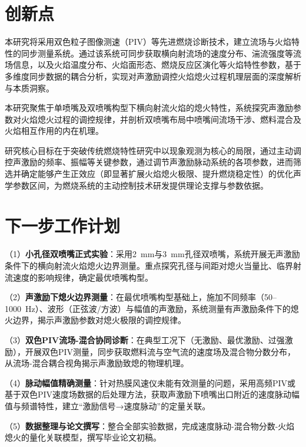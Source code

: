 \section{创新点}

本研究将采用双色粒子图像测速（PIV）等先进燃烧诊断技术，建立流场与火焰特性的同步测量系统。通过该系统可同步获取横向射流场的速度分布、湍流强度等流场信息，以及火焰温度分布、火焰面形态、燃烧反应区演化等火焰特性参数，基于多维度同步数据的耦合分析，实现对声激励调控火焰熄火过程机理层面的深度解析与本质洞察。

本研究聚焦于单喷嘴及双喷嘴构型下横向射流火焰的熄火特性，系统探究声激励参数对火焰熄火过程的调控规律，并剖析双喷嘴布局中喷嘴间流场干涉、燃料混合及火焰相互作用的内在机理。

研究核心目标在于突破传统燃烧特性研究中以现象观测为核心的局限，通过主动调控声激励的频率、振幅等关键参数，通过调节声激励脉动系统的各项参数，进而筛选并确定能够产生正效应（即显著扩展火焰熄火极限、提升燃烧稳定性）的优化声学参数区间，为燃烧系统的主动控制技术研发提供理论支撑与参数依据。


\section{下一步工作计划}

（1）\textbf{小孔径双喷嘴正式实验}：采用2~mm与3~mm孔径双喷嘴，系统开展无声激励条件下的横向射流火焰熄火边界测量。重点探究孔径与间距对熄火当量比、临界射流速度的影响规律，确定最优喷嘴构型。

（2）\textbf{声激励下熄火边界测量}：在最优喷嘴构型基础上，施加不同频率（50--1000~Hz）、波形（正弦波/方波）与幅值的声激励，系统测量有声激励条件下的熄火边界，揭示声激励参数对熄火极限的调控规律。

（3）\textbf{双色PIV流场-混合协同诊断}：在典型工况下（无激励、最优激励、过强激励），开展双色PIV测量，同步获取燃料流与空气流的速度场及混合物分数分布，从流场-混合耦合视角揭示声激励致熄的物理机理。

（4）\textbf{脉动幅值精确测量}：针对热膜风速仪未能有效测量的问题，采用高频PIV或基于双色PIV速度场数据的后处理方法，获取声激励下喷嘴出口附近的速度脉动幅值与频谱特性，建立“激励信号→速度脉动”的定量关联。

（5）\textbf{数据整理与论文撰写}：整合全部实验数据，完成速度脉动-混合物分数-火焰熄火的量化关联模型，撰写毕业论文初稿。